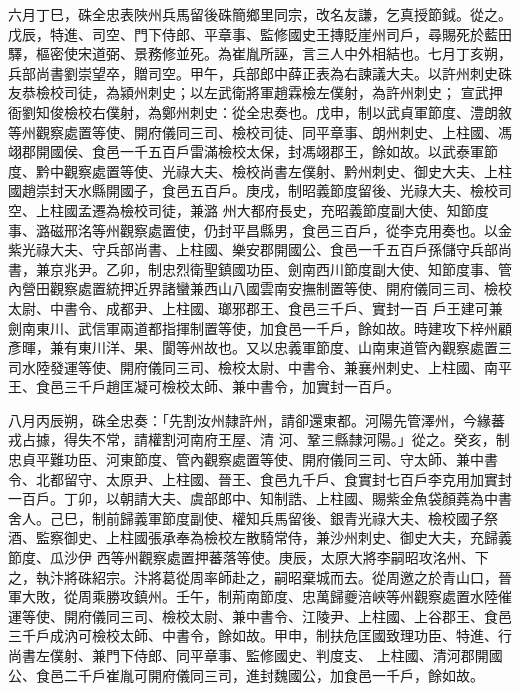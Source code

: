 \begin{pinyinscope}
 六月丁巳，硃全忠表陜州兵馬留後硃簡鄉里同宗，改名友謙，乞真授節鉞。從之。戊辰，特進、司空、門下侍郎、平章事、監修國史王摶貶崖州司戶，尋賜死於藍田驛，樞密使宋道弼、景務修並死。為崔胤所誣，言三人中外相結也。七月丁亥朔，兵部尚書劉崇望卒，贈司空。甲午，兵部郎中薛正表為右諫議大夫。以許州刺史硃友恭檢校司徒，為潁州刺史；以左武衛將軍趙霖檢左僕射，為許州刺史；
 宣武押衙劉知俊檢校右僕射，為鄭州刺史：從全忠奏也。戊申，制以武貞軍節度、澧朗敘等州觀察處置等使、開府儀同三司、檢校司徒、同平章事、朗州刺史、上柱國、馮翊郡開國侯、食邑一千五百戶雷滿檢校太保，封馮翊郡王，餘如故。以武泰軍節度、黔中觀察處置等使、光祿大夫、檢校尚書左僕射、黔州刺史、御史大夫、上柱國趙崇封天水縣開國子，食邑五百戶。庚戌，制昭義節度留後、光祿大夫、檢校司空、上柱國孟遷為檢校司徒，兼潞
 州大都府長史，充昭義節度副大使、知節度事、潞磁邢洺等州觀察處置使，仍封平昌縣男，食邑三百戶，從李克用奏也。以金紫光祿大夫、守兵部尚書、上柱國、樂安郡開國公、食邑一千五百戶孫儲守兵部尚書，兼京兆尹。乙卯，制忠烈衛聖鎮國功臣、劍南西川節度副大使、知節度事、管內營田觀察處置統押近界諸蠻兼西山八國雲南安撫制置等使、開府儀同三司、檢校太尉、中書令、成都尹、上柱國、瑯邪郡王、食邑三千戶、實封一百
 戶王建可兼劍南東川、武信軍兩道都指揮制置等使，加食邑一千戶，餘如故。時建攻下梓州顧彥暉，兼有東川洋、果、閬等州故也。又以忠義軍節度、山南東道管內觀察處置三司水陸發運等使、開府儀同三司、檢校太尉、中書令、兼襄州刺史、上柱國、南平王、食邑三千戶趙匡凝可檢校太師、兼中書令，加實封一百戶。



 八月丙辰朔，硃全忠奏：「先割汝州隸許州，請卻還東都。河陽先管澤州，今緣蕃戎占據，得失不常，請權割河南府王屋、清
 河、鞏三縣隸河陽。」從之。癸亥，制忠貞平難功臣、河東節度、管內觀察處置等使、開府儀同三司、守太師、兼中書令、北都留守、太原尹、上柱國、晉王、食邑九千戶、食實封七百戶李克用加實封一百戶。丁卯，以朝請大夫、虞部郎中、知制誥、上柱國、賜紫金魚袋顏蕘為中書舍人。己巳，制前歸義軍節度副使、權知兵馬留後、銀青光祿大夫、檢校國子祭酒、監察御史、上柱國張承奉為檢校左散騎常侍，兼沙州刺史、御史大夫，充歸義節度、瓜沙伊
 西等州觀察處置押蕃落等使。庚辰，太原大將李嗣昭攻洺州、下之，執汴將硃紹宗。汴將葛從周率師赴之，嗣昭棄城而去。從周邀之於青山口，晉軍大敗，從周乘勝攻鎮州。壬午，制荊南節度、忠萬歸夔涪峽等州觀察處置水陸催運等使、開府儀同三司、檢校太尉、兼中書令、江陵尹、上柱國、上谷郡王、食邑三千戶成汭可檢校太師、中書令，餘如故。甲申，制扶危匡國致理功臣、特進、行尚書左僕射、兼門下侍郎、同平章事、監修國史、判度支、
 上柱國、清河郡開國公、食邑二千戶崔胤可開府儀同三司，進封魏國公，加食邑一千戶，餘如故。




\end{pinyinscope}
